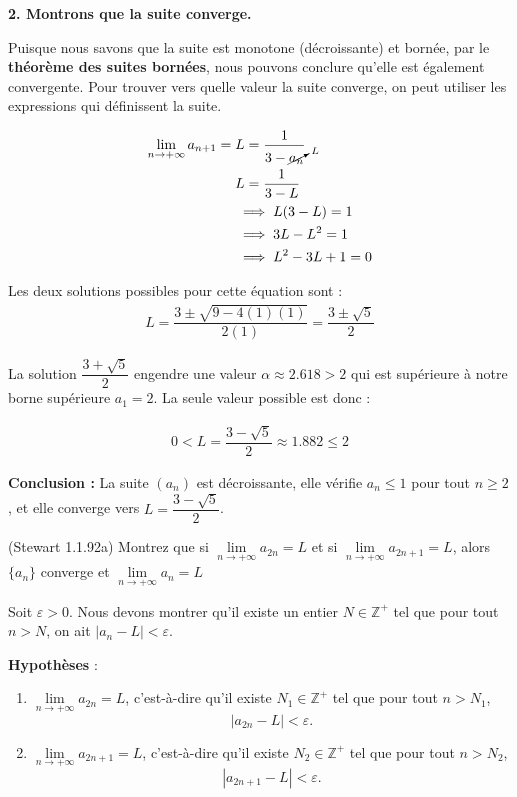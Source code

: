 \documentclass{report}
\begin{document}
\textbf{2. Montrons que la suite converge.}


Puisque nous savons que la suite est monotone (décroissante) et bornée, 
par le \textcolor{myb}{\textbf{théorème des suites bornées}}, 
nous pouvons conclure qu'elle est également convergente. Pour trouver 
vers quelle valeur la suite converge, on peut utiliser les expressions qui 
définissent la suite. 

\begin{align*}
    \lim\limits_{n \to+\infty } a_{n+1} = \; &L = \dfrac{1}{3 - \cancelto{L}{a_n}}  \\
                                             &L = \dfrac{1}{3 - L} \\ 
    &
    \implies L(3 - L) = 1 \\ 
    &
    \implies 3L -L^2 = 1 \\ 
    & 
    \implies L^2 -3L + 1 = 0
\end{align*}            

Les deux solutions possibles pour cette équation sont : 
\begin{align*}
    L = \dfrac{3 \pm \sqrt{9 -4(1)(1)}}{2(1)} = \dfrac{3 \pm \sqrt{5}}{2}
\end{align*}


La solution $\dfrac{3+\sqrt{5}}{2}$ engendre une valeur $\alpha \approx 2.618 > 2$ qui est supérieure à 
notre borne supérieure $a_1 = 2$. La seule valeur possible est donc :

\begin{align*}
    \boxed{0 < L = \dfrac{3-\sqrt{5}}{2} \approx  1.882 \leq 2 }
\end{align*}
 

\textbf{Conclusion :} La suite \( (a_n) \) est décroissante, elle vérifie \( a_n \leq 1 \)
pour tout \( n \geq 2 \), et elle converge vers \( L = \dfrac{3 - \sqrt{5}}{2} \).


\begin{Exercice}{(Stewart 1.1.92a)}{}
    Montrez que si $\lim\limits_{n \to+\infty }a_{2n} = L$ et si  
    $\lim\limits_{n \to+\infty }a_{2n + 1} = L$, alors $\{a_n\}$ converge et
    $\lim\limits_{n \to+\infty }a_n = L$ 
\end{Exercice}

Soit $\varepsilon > 0$. Nous devons montrer qu'il existe un entier $N \in 
\mathbb{Z}^+$ tel que pour tout $n > N$, on ait $|a_n - L| < \varepsilon$.

\textbf{Hypothèses} :
\begin{enumerate}
    \item $\lim\limits_{n \to +\infty} a_{2n} = L$, c'est-à-dire qu'il existe 
    $N_1 \in \mathbb{Z}^+$ tel que pour tout $n > N_1$,
    \[
    |a_{2n} - L| < \varepsilon.
    \]
    \item $\lim\limits_{n \to +\infty} a_{2n+1} = L$, c'est-à-dire qu'il existe 
    $N_2 \in \mathbb{Z}^+$ tel que pour tout $n > N_2$,
    \[
    |a_{2n+1} - L| < \varepsilon.
    \]
\end{enumerate}
\end{document}
